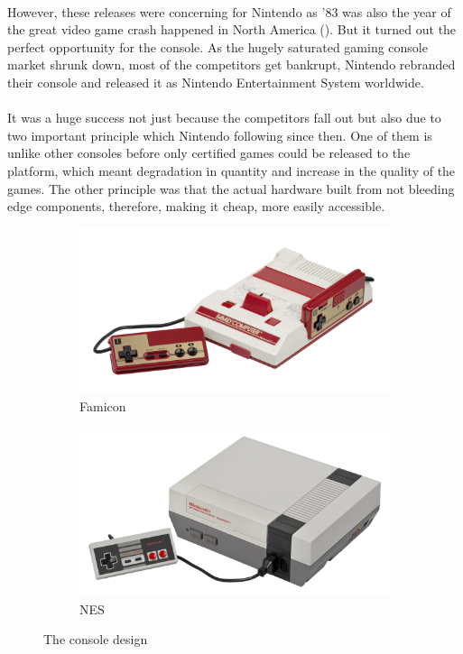 \documentclass[]{report}
\begin{document}
\paragraph{ }
However, these releases were concerning for Nintendo as '83 was also the year of the great video game crash happened in North America (\cite{CRSH}). But it turned out the perfect opportunity for the console. As the hugely saturated gaming console market shrunk down, most of the competitors get bankrupt, Nintendo rebranded their console and released it as Nintendo Entertainment System worldwide.
\paragraph{ }
 It was a huge success not just because the competitors fall out but also due to two important principle which Nintendo following since then. One of them is unlike other consoles before only certified games could be released to the platform, which meant degradation in quantity and increase in the quality of the games. The other principle was that the actual hardware built from not bleeding edge components, therefore, making it cheap, more easily accessible.
 
\begin{figure}[!htb]
	\centering
	\begin{subfigure}[b]{0.4\textwidth}
		\includegraphics[width=\textwidth]{images/famicon.jpg}
		\caption{Famicon}
		\label{fig:1}
	\end{subfigure}
	\begin{subfigure}[b]{0.4\textwidth}
		\includegraphics[width=\textwidth]{images/nes.jpg}
		\caption{NES}
		\label{fig:2}
	\end{subfigure}
	\caption{\label{fig:my-label} The console design}
\end{figure}
\clearpage
\end{document}
